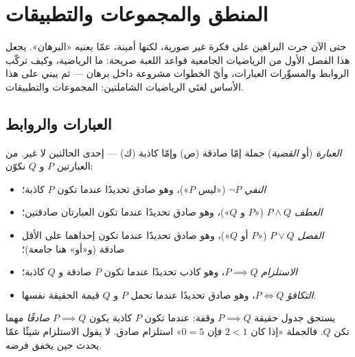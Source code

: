 \chapter{المنطق والمجموعات والتطبيقات}\label{ch:b1:logic}

حتى الآن جرت البراهين على فكرة غير صورية، لكنها أمينة، عمّا يعنيه
«البرهان». يجعل هذا الفصل الأول من الرياضيات الجامعية قواعد اللعبة
صريحة: ما  الرياضية، وكيف تركّب الروابط والمسوِّرات العبارات،
وأيّ الخطوات مشروعة داخل برهان --- ثم يبني على هذا الأساس لغتَي
الرياضيات الشاملتين: المجموعات والتطبيقات.

\section{العبارات والروابط}

\begin{definition}\label{def:b1:logic:statement}
\emph{العبارة} (أو \emph{القضية}) جملة إمّا صادقة (ص) وإمّا
كاذبة (ك) --- إحدى الحالتين لا غير. من العبارتين $P$ و $Q$ نكوّن:
\begin{itemize}
  \item \emph{النفي} $\lnot P$ («ليس $P$»)، وهو صادق تحديدًا عندما
        تكون $P$ كاذبة؛
  \item \emph{العطف} $P \land Q$ («$P$ و $Q$»)، وهو صادق تحديدًا
        عندما تكون العبارتان صادقتين؛
  \item \emph{الفصل} $P \lor Q$ («$P$ أو $Q$»)، وهو صادق تحديدًا
        عندما تكون إحداهما على الأقل صادقة (و«أو» هنا جامعة)؛
  \item \emph{الاستلزام} $P \implies Q$، وهو كاذب تحديدًا عندما تكون
        $P$ صادقة و $Q$ كاذبة؛
  \item \emph{التكافؤ} $P \iff Q$، وهو صادق تحديدًا عندما تحمل $P$
        و $Q$ قيمة الحقيقة نفسها.
\end{itemize}
\end{definition}

\begin{remark}
يستحق جدول حقيقة $P \implies Q$ وقفة: عندما تكون $P$ كاذبة يكون
$P \implies Q$ \emph{صادقًا} مهما تكن $Q$. فالجملة «إذا كان $2 < 1$
فإن $0 = 5$» استلزام صادق. لا يقول الاستلزام شيئًا عمّا يحدث حين
يخفق فرضه.
\end{remark}

